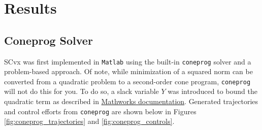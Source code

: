 \documentclass{article}
\begin{document}
\section{Results}

\subsection{Coneprog Solver}

SCvx was first implemented in \texttt{Matlab} using the built-in \texttt{coneprog} solver and a problem-based approach.
Of note, while minimization of a squared norm can be converted from a quadratic problem to a second-order cone program, \texttt{coneprog} will not do this for you.
To do so, a slack variable $Y$ was introduced to bound the quadratic term as described in \href{https://www.mathworks.com/help/optim/ug/convert-qp-to-socp.html}{Mathworks documentation}.
Generated trajectories and control efforts from \texttt{coneprog} are shown below in Figures \ref{fig:coneprog_trajectories} and \ref{fig:coneprog_controls}.
\end{document}
